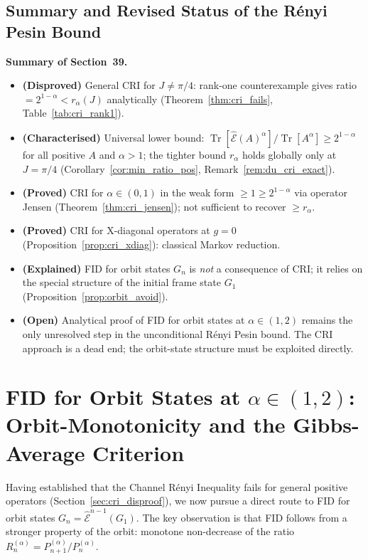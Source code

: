 \documentclass[12pt,a4paper]{article}
\begin{document}
\subsection{Summary and Revised Status of the Rényi Pesin Bound}
\label{sec:cri_summary2}

\bigskip
\noindent\textbf{Summary of Section~39.}
\begin{itemize}
\item \textbf{(Disproved)} General CRI for $J\neq\pi/4$:
  rank-one counterexample gives ratio $= 2^{1-\alpha} < r_\alpha(J)$ analytically
  (Theorem~\ref{thm:cri_fails}, Table~\ref{tab:cri_rank1}).
\item \textbf{(Characterised)} Universal lower bound:
  $\operatorname{Tr}[\hat{\mathcal{E}}(A)^\alpha]/\operatorname{Tr}[A^\alpha]\geq 2^{1-\alpha}$
  for all positive $A$ and $\alpha>1$;
  the tighter bound $r_\alpha$ holds globally only at $J=\pi/4$
  (Corollary~\ref{cor:min_ratio_pos}, Remark~\ref{rem:du_cri_exact}).
\item \textbf{(Proved)} CRI for $\alpha\in(0,1)$ in the weak form
  $\geq 1\geq 2^{1-\alpha}$ via operator Jensen (Theorem~\ref{thm:cri_jensen});
  not sufficient to recover $\geq r_\alpha$.
\item \textbf{(Proved)} CRI for X-diagonal operators at $g=0$
  (Proposition~\ref{prop:cri_xdiag}): classical Markov reduction.
\item \textbf{(Explained)} FID for orbit states $G_n$ is \emph{not} a consequence
  of CRI; it relies on the special structure of the initial frame state $G_1$
  (Proposition~\ref{prop:orbit_avoid}).
\item \textbf{(Open)} Analytical proof of FID for orbit states at
  $\alpha\in(1,2)$ remains the only unresolved step in the unconditional
  Rényi Pesin bound.  The CRI approach is a dead end; the orbit-state
  structure must be exploited directly.
\end{itemize}

\section{FID for Orbit States at $\alpha\in(1,2)$:
  Orbit-Monotonicity and the Gibbs-Average Criterion}
\label{sec:fid_orbit}

Having established that the Channel Rényi Inequality fails for general positive
operators (Section~\ref{sec:cri_disproof}), we now pursue a direct route to FID
for orbit states $G_n=\hat{\mathcal{E}}^{n-1}(G_1)$.
The key observation is that FID follows from a stronger property of the orbit:
monotone non-decrease of the ratio $R_n^{(\alpha)}=P_{n+1}^{(\alpha)}/P_n^{(\alpha)}$.
\end{document}
